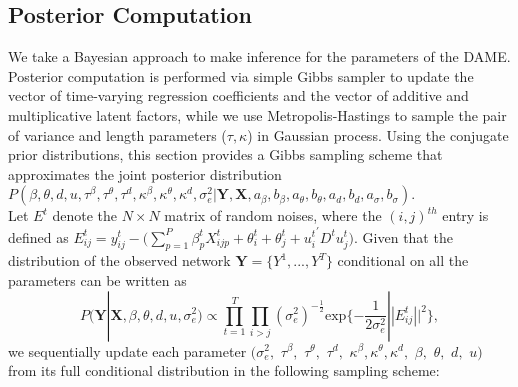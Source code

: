 \documentclass[a4paper]{article}
\begin{document}
\subsection{Posterior Computation}\label{subsec: posterior computation}
We take a Bayesian approach to make inference for the parameters of the DAME. Posterior computation is performed via simple Gibbs sampler to update the vector of time-varying regression coefficients and the vector of additive and multiplicative latent factors, while we use Metropolis-Hastings to sample the pair of variance and length parameters ($\tau, \kappa$) in Gaussian process. Using the conjugate prior distributions, this section provides a Gibbs sampling scheme that approximates the joint posterior distribution $P(\beta,  \theta, d, u, \tau^{\beta},\tau^{\theta}, \tau^{d}, \kappa^\beta, \kappa^\theta, \kappa^d, \sigma_e^2|\mathbf{Y}, \mathbf{X}, a_\beta, b_\beta, a_\theta, b_\theta, a_d, b_d, a_\sigma, b_\sigma)$. \\ \newline
Let $E^t$ denote the $N \times N$ matrix of random noises, where the $(i, j)^{th}$ entry is defined as $E^t_{ij} = y^t_{ij}-\big(\sum\limits_{p=1}^P \beta^t_{p}X^t_{ijp}+\theta^t_{i}+\theta^t_{j}+{u^t_{i}}^\prime D^tu^t_{j}\big)$. Given that the distribution of the observed network $\mathbf{Y}= \{Y^1,...,Y^T\}$ conditional on all the parameters can be written as
\begin{equation}
	P(\boldsymbol{Y}|\boldsymbol{X}, {\beta}, {\theta}, {d}, {u},\sigma_e^2)\propto  \prod_{t=1}^T\prod_{i>j}(\sigma_e^2)^{-\frac{1}{2}}\mbox{exp}\{-\frac{1}{2\sigma_e^2}||E^t_{ij}||^2\},
\end{equation}
we sequentially update each parameter $(\sigma_e^2,$ $\tau^{\beta},$ $\tau^{\theta}, $ $\tau^{d},$ $\kappa^\beta, \kappa^\theta, \kappa^d,$ $\beta, $ $\theta,$ $d,$ $u)$ from its full conditional distribution in the following sampling scheme:
\end{document}
